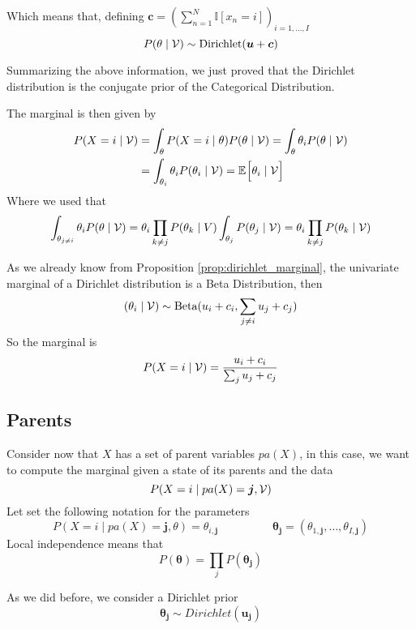 Which means that, defining \(\bm{c} = ( \sum_{n=1}^{N}\mathbb{I}[x_{n} = i])_{i = 1,\dots,I}\)
\[
  P(\theta \mid \mathcal{V}) \sim \text{Dirichlet}(\bm{u} + \bm{c})
\]
\begin{remark}
Summarizing the above information, we just proved that the Dirichlet distribution is the conjugate prior of the Categorical Distribution.
\end{remark}
The marginal is then given by
\[
  \begin{aligned}
    P(X=i \mid \mathcal{V}) &= \int_{\theta}P(X=i \mid \theta)P(\theta \mid \mathcal{V}) =  \int_{\theta}\theta_{i}P(\theta \mid \mathcal{V})\\
    &=  \int_{\theta_{i}}\theta_{i}P(\theta_{i} \mid \mathcal{V}) = \mathbb{E}_{}\Big[\theta_{i} \mid \mathcal{V}\Big]
\end{aligned}
\]
Where we used that
\[\int_{\theta_{j \neq i}}\theta_{i} P(\theta \mid \mathcal{V}) = \theta_{i}\prod_{k\neq j}P(\theta_{k} \mid V) \int_{\theta_{j}}P(\theta_{j}\mid \mathcal{V}) = \theta_{i} \prod_{k \neq j}P(\theta_{k} \mid \mathcal{V})\]

As we already know from Proposition \ref{prop:dirichlet_marginal}, the univariate marginal of a Dirichlet distribution is a
Beta Distribution, then
\[
  (\theta_{i} \mid \mathcal{V}) \sim \text{Beta}(u_{i} + c_{i}, \sum_{j\neq i} u_{j} + c_{j})
\]
So the marginal is
\[
  P(X = i \mid \mathcal{V}) = \frac{u_{i} + c_{i}}{\sum_{j}u_{j} + c_{j}}
\]

\subsection{Parents}
Consider now that \(X\) has a set of parent variables \(pa(X)\), in this case,
we want to compute the marginal given a state of its parents and the data
\[
  P(X = i \mid pa(X) = \bm{j}, \mathcal{V})
\]
Let set the following notation for the parameters
\[
  P(X = i \mid pa(X) = \bm{j}, \theta) = \theta_{i,\bm{j}} \hspace{2cm} \bm{\theta_{j}} = (\theta_{1,\bm{j}},\dots, \theta_{I,\bm{j}})
\]
Local independence means that
\[
  P(\bm{\theta}) = \prod_{j}P(\bm{\theta_{j}})
\]

As we did before, we consider a Dirichlet prior
\[
  \bm{\theta_{j}} \sim Dirichlet(\bm{u_{j}})
\]



